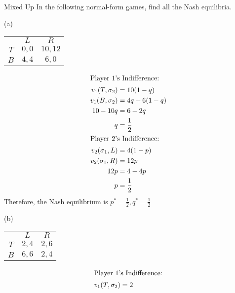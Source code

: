 \documentclass[8pt]{extarticle}
\begin{document}
  \begin{problem}{Mixed Up}
    In the following normal-form games, find all the Nash equilibria.
    \tcblower
    \begin{problem}{(a)}
      \begin{center}
        \renewcommand{\arraystretch}{1.5}
        \begin{tabular}{c|c|c|}
          \multicolumn{1}{c}{} & \multicolumn{1}{c}{$L$} & \multicolumn{1}{c}{$R$}\\
          \cline{2-3}
          $T$ & $0,0$ & $10,12$\\
          \cline{2-3}
          $B$ & $4,4$ & $6,0$\\
          \cline{2-3}
        \end{tabular}
      \end{center}
      \tcblower
      \begin{align*}
        \shortintertext{Player 1's Indifference:}
        v_1(T,\sigma_2) &= 10(1-q)\\
        v_1(B,\sigma_2) &= 4q + 6(1-q)\\
        10-10q &= 6-2q\\
        q &= \frac{1}{2}\\
        \shortintertext{Player 2's Indifference:}
        v_2(\sigma_1,L) &= 4(1-p)\\
        v_2(\sigma_1,R) &= 12p\\
        12p &= 4-4p\\
        p &= \frac{1}{2}
      \end{align*}
      Therefore, the Nash equilibrium is $p^* = \frac{1}{2},q^* = \frac{1}{2}$
    \end{problem}
    \begin{problem}{(b)}
      \begin{center}
        \renewcommand{\arraystretch}{1.5}
        \begin{tabular}{c|c|c|}
          \multicolumn{1}{c}{} & \multicolumn{1}{c}{$L$} & \multicolumn{1}{c}{$R$}\\
          \cline{2-3}
          $T$ & $2,4$ & $2,6$\\
          \cline{2-3}
          $B$ & $6,6$ & $2,4$\\
          \cline{2-3}
        \end{tabular}
      \end{center}
      \tcblower
      \begin{align*}
        \shortintertext{Player 1's Indifference:}
        v_1(T,\sigma_2) &= 2\\

\end{align*}
\end{problem}
\end{problem}
\end{document}
